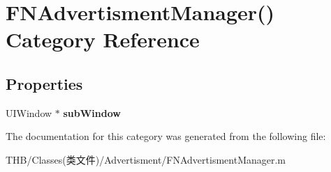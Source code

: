 \hypertarget{category_f_n_advertisment_manager_07_08}{}\section{F\+N\+Advertisment\+Manager() Category Reference}
\label{category_f_n_advertisment_manager_07_08}
\subsection*{Properties}
\begin{DoxyCompactItemize}
\item 
\mbox{\label{category_f_n_advertisment_manager_07_08_a7ec652ce6a2ab85612899bb9a09f43e9}} 
U\+I\+Window $\ast$ {\bfseries sub\+Window}
\end{DoxyCompactItemize}


The documentation for this category was generated from the following file\+:\begin{DoxyCompactItemize}
\item 
T\+H\+B/\+Classes(类文件)/\+Advertisment/F\+N\+Advertisment\+Manager.\+m\end{DoxyCompactItemize}
